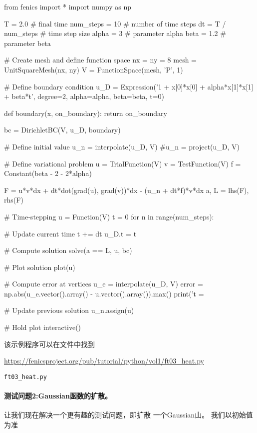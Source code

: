 \begin{python}
from fenics import *
import numpy as np

T = 2.0            # final time
num_steps = 10     # number of time steps
dt = T / num_steps # time step size
alpha = 3          # parameter alpha
beta = 1.2         # parameter beta

# Create mesh and define function space
nx = ny = 8
mesh = UnitSquareMesh(nx, ny)
V = FunctionSpace(mesh, 'P', 1)

# Define boundary condition
u_D = Expression('1 + x[0]*x[0] + alpha*x[1]*x[1] + beta*t',
                 degree=2, alpha=alpha, beta=beta, t=0)

def boundary(x, on_boundary):
    return on_boundary

bc = DirichletBC(V, u_D, boundary)

# Define initial value
u_n = interpolate(u_D, V)
#u_n = project(u_D, V)

# Define variational problem
u = TrialFunction(V)
v = TestFunction(V)
f = Constant(beta - 2 - 2*alpha)

F = u*v*dx + dt*dot(grad(u), grad(v))*dx - (u_n + dt*f)*v*dx
a, L = lhs(F), rhs(F)

# Time-stepping
u = Function(V)
t = 0
for n in range(num_steps):

    # Update current time
    t += dt
    u_D.t = t

    # Compute solution
    solve(a == L, u, bc)

    # Plot solution
    plot(u)

    # Compute error at vertices
    u_e = interpolate(u_D, V)
    error = np.abs(u_e.vector().array() - u.vector().array()).max()
    print('t = %

    # Update previous solution
    u_n.assign(u)

# Hold plot
interactive()
\end{python}
该示例程序可以在文件中找到
\begin{center}
  \url{https://fenicsproject.org/pub/tutorial/python/vol1/ft03_heat.py}
\end{center}
\begin{center}
  {\nolinkurl{ft03_heat.py}}
\end{center}


\paragraph{测试问题2:Gaussian函数的扩散。}
让我们现在解决一个更有趣的测试问题，即扩散
一个Gaussian山。 我们以初始值为准

